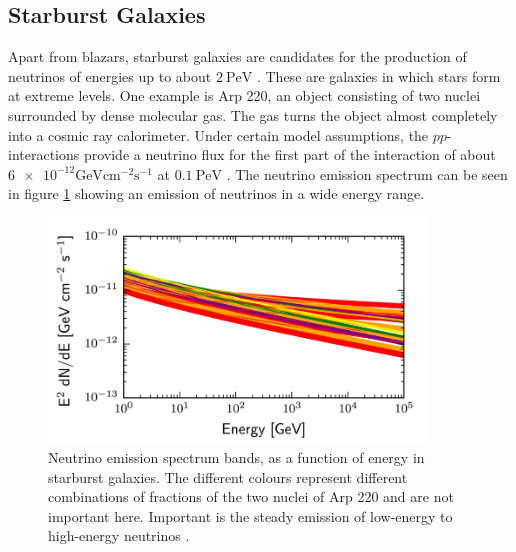\subsection{Starburst Galaxies}

Apart from blazars, starburst galaxies are candidates for the production of neutrinos of energies up to about $\SI{2}{\peta\electronvolt}$ \cite{starburst2}.
These are galaxies in which stars form at extreme levels.
One example is Arp 220, an object consisting of two nuclei surrounded by dense molecular gas.
The gas turns the object almost completely into a cosmic ray calorimeter.
Under certain model assumptions, the $pp$-interactions provide a neutrino flux for the first part of the interaction of about $\num{6e-12}\si{\giga\electronvolt\centi\meter\tothe{-2}\second\tothe{-1}}$ at $\SI{0.1}{\peta\electronvolt}$ \cite{starburst}.
The neutrino emission spectrum can be seen in figure \ref{fig:starburst} showing an emission of neutrinos in a wide energy range.
\begin{figure}
    \centering
    \includegraphics[width=10cm]{Plots/01_5_astroparticle/starburst_flux.png}
    \caption{Neutrino emission spectrum bands, as a function of energy in starburst galaxies. The different colours represent different combinations of fractions of the two nuclei of Arp 220 and are not important here. Important is the steady emission of low-energy to high-energy neutrinos \cite{starburst}.}
    \label{fig:starburst}
\end{figure}
